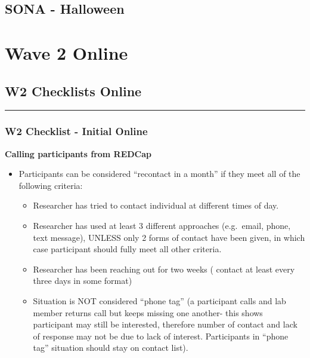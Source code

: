 \documentclass[
]{book}
\providecommand{\tightlist}{%
  \setlength{\itemsep}{0pt}\setlength{\parskip}{0pt}}
\begin{document}
\hypertarget{sona---halloween}{%
\section{SONA - Halloween}\label{sona---halloween}}

\hypertarget{wave-2-online}{%
\chapter{Wave 2 Online}\label{wave-2-online}}

\hypertarget{w2-checklists-online}{%
\section{W2 Checklists Online}\label{w2-checklists-online}}

\begin{center}\rule{0.5\linewidth}{0.5pt}\end{center}

\hypertarget{w2-checklist---initial-online}{%
\subsection{W2 Checklist - Initial Online}\label{w2-checklist---initial-online}}

\textbf{Calling participants from REDCap}

\begin{itemize}
\tightlist
\item
  Participants can be considered ``recontact in a month'' if they meet all of the following criteria:

  \begin{itemize}
  \tightlist
  \item
    Researcher has tried to contact individual at different times of day.
  \item
    Researcher has used at least 3 different approaches (e.g.~email, phone, text message), UNLESS only 2 forms of contact have been given, in which case participant should fully meet all other criteria.
  \item
    Researcher has been reaching out for two weeks ( contact at least every three days in some format)\\
  \item
    Situation is NOT considered ``phone tag'' (a participant calls and lab member returns call but keeps missing one another- this shows participant may still be interested, therefore number of contact and lack of response may not be due to lack of interest. Participants in ``phone tag'' situation should stay on contact list).
  \end{itemize}
\end{itemize}
\end{document}
